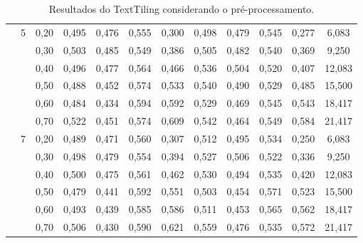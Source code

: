 \begin{table}[!h]
\begin{tabular}{|c|c|c||c|c|c|c||c|c|c|c||c|}
& \multirow{6}{*}{5}                                                                                                                
	  & 0,20    & 0,495 & 0,476 & 0,555 & 0,300         &     0,498 &  0,479 & 0,545 & 0,277 & 6,083               \\ \cline{3-12}  
	 && 0,30    & 0,503 & 0,485 & 0,549 & 0,386         &     0,505 &  0,482 & 0,540 & 0,369 & 9,250               \\ \cline{3-12}  
	 && 0,40    & 0,496 & 0,477 & 0,564 & 0,466         &     0,536 &  0,504 & 0,520 & 0,407 & 12,083              \\ \cline{3-12}  
	 && 0,50    & 0,488 & 0,452 & 0,574 & 0,533         &     0,540 &  0,490 & 0,529 & 0,485 & 15,500              \\ \cline{3-12}  
	 && 0,60    & 0,484 & 0,434 & 0,594 & 0,592         &     0,529 &  0,469 & 0,545 & 0,543 & 18,417              \\ \cline{3-12}  
	 && 0,70    & 0,522 & 0,451 & 0,574 & 0,609         &     0,542 &  0,464 & 0,549 & 0,584 & 21,417              \\ \cline{2-12}  
& \multirow{6}{*}{7}                                                                                                                
	  & 0,20    & 0,489 & 0,471 & 0,560 & 0,307         &     0,512 &  0,495 & 0,534 & 0,250 & 6,083               \\ \cline{3-12}  
	 && 0,30    & 0,498 & 0,479 & 0,554 & 0,394         &     0,527 &  0,506 & 0,522 & 0,336 & 9,250               \\ \cline{3-12}  
	 && 0,40    & 0,500 & 0,475 & 0,561 & 0,462         &     0,530 &  0,494 & 0,535 & 0,420 & 12,083              \\ \cline{3-12}  
	 && 0,50    & 0,479 & 0,441 & 0,592 & 0,551         &     0,503 &  0,454 & 0,571 & 0,523 & 15,500              \\ \cline{3-12}  
	 && 0,60    & 0,493 & 0,439 & 0,585 & 0,586         &     0,511 &  0,453 & 0,565 & 0,562 & 18,417              \\ \cline{3-12}  
	 && 0,70    & 0,506 & 0,430 & 0,590 & 0,621         &     0,559 &  0,476 & 0,535 & 0,572 & 21,417              \\ \hline      
 \end{tabular}  
 \label{tab:resultadosc99}
\caption{Resultados do TextTiling considerando o pré-processamento.}
\end{table} 
